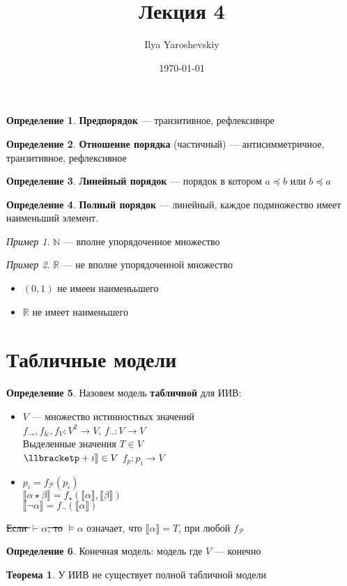 \documentclass[english]{article}
\author{Ilya Yaroshevskiy}
\date{\today}
\title{Лекция 4}
\newcommand{\R}{\mathbb{R}}
\newcommand{\N}{\mathbb{N}}
\theoremstyle{plain}
\theoremstyle{remark}
\newtheorem*{examp}{Пример}
\theoremstyle{definition}
\newtheorem{theorem}{Теорема}[section]
\newtheorem*{definition}{Определение}
\begin{document}
\maketitle
\tableofcontents

\renewcommand{\P}{\mathcal{P}}
\newcommand{\A}{\mathcal{A}}
\newcommand{\L}{\mathcal{L}}
\newcommand{\B}{\mathcal{B}}


\begin{definition}
\textbf{Предпорядок} --- транзитивное, рефлексивнре
\end{definition}
\begin{definition}
\textbf{Отношение порядка} (частичный) --- антисимметричное, транзитивное, рефлексивное
\end{definition}
\begin{definition}
\textbf{Линейный порядок} --- порядок в котором \(a \preceq b\) или \(b \preceq a\)
\end{definition}
\begin{definition}
\textbf{Полный порядок} --- линейный, каждое подмножество имеет наименьший элемент. 
\end{definition}
\begin{examp}
\(\N\) --- вполне упорядоченное множество
\end{examp}
\begin{examp}
\(\R\) --- не вполне упорядоченной множество
\begin{itemize}
\item \((0, 1)\) не имееи наименььшего
\item \(\R\) не имеет наименьшего
\end{itemize}
\end{examp}
\section{Табличные модели}
\label{sec:org98800a3}
\begin{definition}
Назовем модель \textbf{табличной} для ИИВ:
\begin{itemize}
\item \(V\) --- множество истинностных значений \\
\(f_\to,f_\&, f_V: V^2 \to V\), \(f_\neg: V \to V\) \\
Выделенные значения \(T \in V\) \\
\(\llbracketp+i\rrbracket \in V\) \(f_p : p_i \to V\)
\item \(p_i = f_\P(p_i)\) \\
\(\llbracket\alpha \star \beta\rrbracket = f_\star(\llbracket\alpha\rrbracket, \llbracket\beta\rrbracket)\) \\
\(\llbracket\neg \alpha\rrbracket = f_\neg(\llbracket\alpha\rrbracket)\)
\end{itemize}
\sout{Если \(\vdash \alpha\), то} \(\vDash \alpha\) означает, что \(\llbracket\alpha\rrbracket = T\), при любой \(f_\P\)
\end{definition}
\begin{definition}
Конечная модель: модель где \(V\) --- конечно
\end{definition}
\begin{theorem}
У ИИВ не существует полной табличной модели
\end{theorem}
\end{document}

